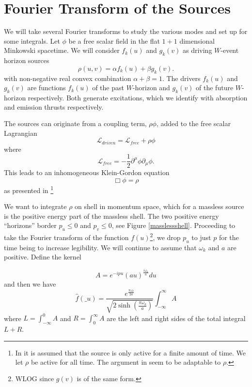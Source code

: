 \documentclass[12pt,a4paper]{article}
\begin{document}
\section{Fourier Transform of the Sources}
We will take several Fourier transforms to study the various modes and set up for some
integrals.  Let $\phi$ be a free scalar field in the flat $1+1$ dimensional Minkowski spacetime.  We will consider $f_k(u)$ and $g_k(v)$ as driving $W$-event horizon sources
\begin{equation}
\label{ab}
\rho(u,v) = \alpha f_k(u) + \beta g_k(v).
\end{equation}
with non-negative real convex combination $\alpha + \beta = 1$.
The drivers $f_k(u)$ and $g_k(v)$ are functions $f_k(u)$ of the past $W$-horizon and $g_k(v)$ of the future $W$-horizon respectively.  Both generate excitations, which we identify with absorption and emission thrusts respectively.


The sources can originate from a coupling term, $\rho \phi$, added to the free scalar Lagrangian
\begin{equation}
\mathscr{L}_{driven} = \mathscr{L}_{free} + \rho\phi 
\end{equation}
where
\begin{equation}
  \mathscr{L}_{free} = -\frac{1}{2} \partial^\mu \phi \partial_\mu \phi.
\end{equation}
This leads to an inhomogeneous Klein-Gordon equation
\begin{equation}
\Box  \phi = \rho
\end{equation}
as presented in \cite{beisert}\footnote{In \cite{beisert} it is assumed that the source is only active for a finite amount of time.  We let $\rho$ be active for all time.  The argument in \cite{beisert} seem to be adaptable to $\rho$.}

We want to integrate $\rho$ on shell in momentum space, which for a massless source is the positive energy part of the massless shell.  The two positive energy ``horizons'' border $p_u \le 0$ and $p_v \le 0$, see Figure \ref{masslessshell}.  Proceeding to take the Fourier transform of the function $f(u)$\footnote{WLOG since $g(v)$ is of the same form.}, we drop $p_u$ to just $p$ for the time being to increase legibility.  We will continue to assume that $\omega_k$ and $a$ are positive. Define the kernel

\begin{equation}
  A = e^{-i p u} (au)^\frac{i\omega_k}{a} du
\end{equation}
and then we have
\begin{equation}
\label{finalnorm}
  \hat{f}(\_u) =  \frac{e^{\frac{\pi \omega_k}{2a}}}{\sqrt{2 \sinh \left({\frac{\pi\omega_k}{a}}\right)}}  \int_{-\infty}^\infty A
\end{equation}
where $L=\int_{-\infty}^0 A$ and $R=\int_0^\infty A$ are the left and right sides of the total integral $L + R$.
\end{document}
